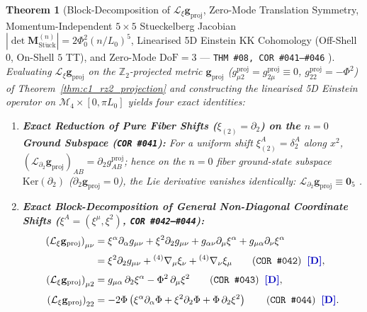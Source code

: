 \documentclass[11pt,a4paper]{article}
\newcommand{\catD}{\text{\textbf{\textcolor{blue!75!black}{[D]}}}}
\theoremstyle{definition}
\theoremstyle{plain}
\newtheorem{theorem}[axiom]{Theorem}
\theoremstyle{remark}
\begin{document}
\begin{theorem}[Block-Decomposition of $\mathcal{L}_\xi\mathbf{g}_{\mathrm{proj}}$, Zero-Mode Translation Symmetry, Momentum-Independent $5\times 5$ Stueckelberg Jacobian $|\det\mathbf{M}_{\mathrm{St\ddot{u}ck}}^{(n)}| = 2\Phi_0^2(n/L_0)^5$, Linearised 5D Einstein KK Cohomology (Off-Shell $0$, On-Shell $5$ TT), and Zero-Mode $\mathrm{DoF} = 3$ --- \texttt{THM~\#08, COR~\#041--\#046} \catD]\label{thm:c2_coord_shift_nilpotent}
Evaluating $\mathcal{L}_\xi \mathbf{g}_{\mathrm{proj}}$ on the $\mathbb{Z}_2$-projected metric $\mathbf{g}_{\mathrm{proj}}$ ($g_{\mu 2}^{\mathrm{proj}} = g_{2\mu}^{\mathrm{proj}} \equiv 0$, $g_{22}^{\mathrm{proj}} = -\Phi^2$) of Theorem~\ref{thm:c1_rz2_projection} and constructing the linearised 5D Einstein operator on $\mathcal{M}_4 \times [0, \pi L_0]$ yields four exact identities:
\begin{enumerate}[label=(\roman*)]
  \item \textbf{Exact Reduction of Pure Fiber Shifts ($\xi_{(2)} = \partial_2$) on the $n = 0$ Ground Subspace (\texttt{COR~\#041}):}
  For a uniform shift $\xi_{(2)}^A = \delta^A_2$ along $x^2$, $\left(\mathcal{L}_{\partial_2} \mathbf{g}_{\mathrm{proj}}\right)_{AB} = \partial_2 g_{AB}^{\mathrm{proj}}$; hence on the $n = 0$ fiber ground-state subspace $\mathrm{Ker}(\partial_2)$ ($\partial_2 \mathbf{g}_{\mathrm{proj}} = 0$), the Lie derivative vanishes identically: $\mathcal{L}_{\partial_2} \mathbf{g}_{\mathrm{proj}} \equiv \mathbf{0}_5$ \catD.
  \item \textbf{Exact Block-Decomposition of General Non-Diagonal Coordinate Shifts ($\xi^A = (\xi^\mu, \xi^2)$, \texttt{COR~\#042--\#044}):}
  \begin{align}
  \left(\mathcal{L}_\xi \mathbf{g}_{\mathrm{proj}}\right)_{\mu\nu} &= \xi^\alpha \partial_\alpha g_{\mu\nu} + \xi^2 \partial_2 g_{\mu\nu} + g_{\alpha\nu}\partial_\mu \xi^\alpha + g_{\mu\alpha}\partial_\nu \xi^\alpha \nonumber \\[2pt]
  &= \xi^2\partial_2 g_{\mu\nu} + {}^{(4)}\nabla_\mu\xi_\nu + {}^{(4)}\nabla_\nu\xi_\mu \qquad \textnormal{(\texttt{COR~\#042})} \;\;\catD, \label{eq:c2_shift_munu} \\[3pt]
  \left(\mathcal{L}_\xi \mathbf{g}_{\mathrm{proj}}\right)_{\mu 2} &= g_{\mu\alpha}\,\partial_2 \xi^\alpha - \Phi^2\,\partial_\mu \xi^2 \qquad \textnormal{(\texttt{COR~\#043})} \;\;\catD, \label{eq:c2_shift_mu2} \\[3pt]
  \left(\mathcal{L}_\xi \mathbf{g}_{\mathrm{proj}}\right)_{22} &= -2\Phi\left(\xi^\alpha\partial_\alpha\Phi + \xi^2\partial_2\Phi + \Phi\,\partial_2\xi^2\right) \qquad \textnormal{(\texttt{COR~\#044})} \;\;\catD. \label{eq:c2_shift_22}

\end{align}
\end{enumerate}
\end{theorem}
\end{document}
